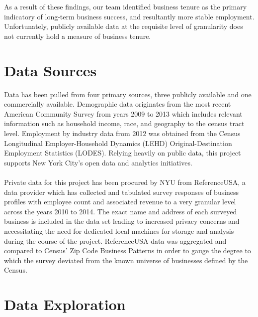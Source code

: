 \documentclass[article, 11pt]{article} %
\begin{document}
\\\\
As a result of these findings, our team identified business tenure as the primary indicatory of long-term business success, and resultantly more stable employment. Unfortunately, publicly available data at the requisite level of granularity does not currently hold a measure of business tenure.


\section*{Data Sources}

Data has been pulled from four primary sources, three publicly available and one commercially available. Demographic data originates from the most recent American Community Survey from years 2009 to 2013 which includes relevant information such as household income, race, and geography to the census tract level. Employment by industry data from 2012 was obtained from the Census Longitudinal Employer-Household Dynamics (LEHD) Original-Destination Employment Statistics (LODES). Relying heavily on public data, this project supports New York City's open data and analytics initiatives. 
\\\\
Private data for this project has been procured by NYU from ReferenceUSA, a data provider which has collected and tabulated survey responses of business profiles with employee count and associated revenue to a very granular level across the years 2010 to 2014. The exact name and address of each surveyed business is included in the data set leading to increased privacy concerns and necessitating the need for dedicated local machines for storage and analysis during the course of the project. ReferenceUSA data was aggregated and compared to Census' Zip Code Business Patterns in order to gauge the degree to which the survey deviated from the known universe of businesses defined by the Census. 


\section*{Data Exploration}
\end{document}
